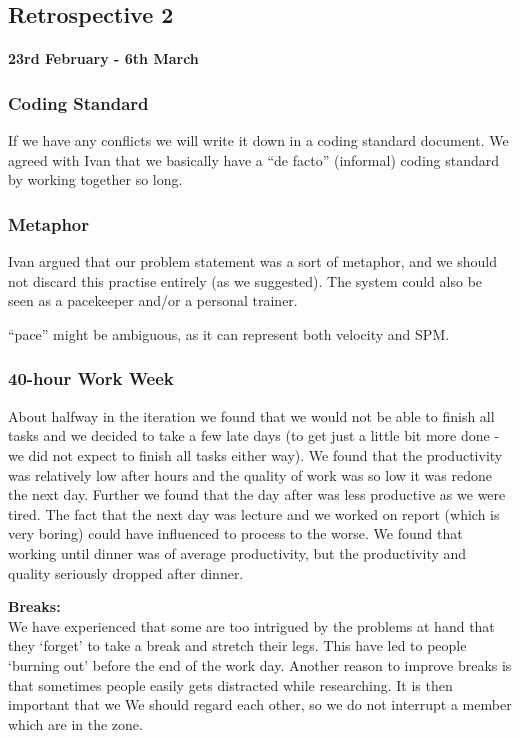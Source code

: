\subsection*{Retrospective 2}
\paragraph{23rd February - 6th March}

\subsubsection{Coding Standard}
If we have any conflicts we will write it down in a coding standard document. We agreed with Ivan that we basically have a ``de facto'' (informal) coding standard by working together so long.

\subsubsection{Metaphor}
Ivan argued that our problem statement was a sort of metaphor, and we should not discard this practise entirely (as we suggested).
The system could also be seen as a pacekeeper and/or a personal trainer.

``pace'' might be ambiguous, as it can represent both velocity and SPM.

\subsubsection{40-hour Work Week}
About halfway in the iteration we found that we would not be able to finish all tasks and we decided to take a few late days (to get just a little bit more done - we did not expect to finish all tasks either way).
We found that the productivity was relatively low after hours and the quality of work was so low it was redone the next day. Further we found that the day after was less productive as we were tired. The fact that the next day was lecture and we worked on report (which is very boring) could have influenced to process to the worse.
We found that working until dinner was of average productivity, but the productivity and quality seriously dropped after dinner.

\textbf{Breaks:}\\
We have experienced that some are too intrigued by the problems at hand that they ‘forget' to take a break and stretch their legs. This have led to people ‘burning out' before the end of the work day.
Another reason to improve breaks is that sometimes people easily gets distracted while researching. It is then important that we 
We should regard each other, so we do not interrupt a member which are in the zone.

